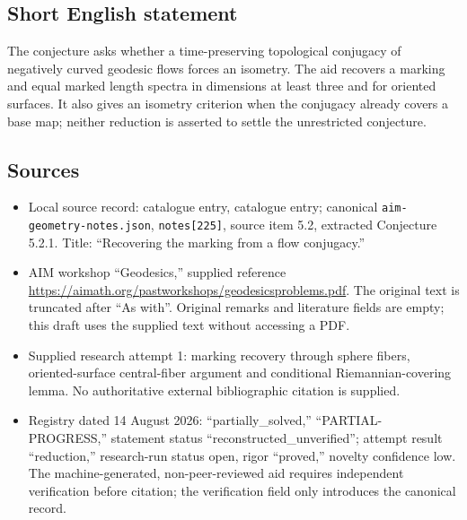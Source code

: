 \documentclass[11pt]{article}
\begin{document}
\subsection{Short English statement}
The conjecture asks whether a time-preserving topological conjugacy of negatively curved geodesic flows forces an isometry. The aid recovers a marking and equal marked length spectra in dimensions at least three and for oriented surfaces. It also gives an isometry criterion when the conjugacy already covers a base map; neither reduction is asserted to settle the unrestricted conjecture.
\subsection{Sources}
\begin{itemize}
\item Local source record: catalogue entry, catalogue entry; canonical \texttt{aim-geometry-notes.json}, \texttt{notes[225]}, source item 5.2, extracted Conjecture 5.2.1. Title: ``Recovering the marking from a flow conjugacy.''
\item AIM workshop ``Geodesics,'' supplied reference \url{https://aimath.org/pastworkshops/geodesicsproblems.pdf}. The original text is truncated after ``As with''. Original remarks and literature fields are empty; this draft uses the supplied text without accessing a PDF.
\item Supplied research attempt 1: marking recovery through sphere fibers, oriented-surface central-fiber argument and conditional Riemannian-covering lemma. No authoritative external bibliographic citation is supplied.
\item Registry dated 14 August 2026: ``partially\_solved,'' ``PARTIAL-PROGRESS,'' statement status ``reconstructed\_unverified''; attempt result ``reduction,'' research-run status open, rigor ``proved,'' novelty confidence low. The machine-generated, non-peer-reviewed aid requires independent verification before citation; the verification field only introduces the canonical record.
\end{itemize}
\end{document}
